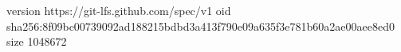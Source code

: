 version https://git-lfs.github.com/spec/v1
oid sha256:8f09bc00739092ad188215bdbd3a413f790e09a635f3e781b60a2ae00aee8ed0
size 1048672
